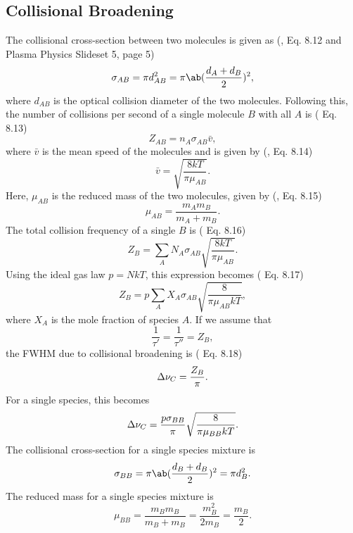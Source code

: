 \documentclass[11pt, twoside, fleqn]{report}
\begin{document}
\subsection{Collisional Broadening}

The collisional cross-section between two molecules is given as (\cite{hansonSpectroscopyOpticalDiagnostics2016}, Eq. 8.12 and Plasma Physics Slideset 5, page 5)
\begin{equation*}
    \sigma_{AB} = \pi d_{AB}^2 = \pi\ab(\frac{d_A + d_B}{2})^2,
\end{equation*}
where $d_{AB}$ is the optical collision diameter of the two molecules. Following this, the number of collisions per second of a single molecule $B$ with all $A$ is (\cite{hansonSpectroscopyOpticalDiagnostics2016} Eq. 8.13)
\begin{equation*}
    Z_{AB} = n_A\sigma_{AB}\bar{v},
\end{equation*}
where $\bar{v}$ is the mean speed of the molecules and is given by (\cite{hansonSpectroscopyOpticalDiagnostics2016}, Eq. 8.14)
\begin{equation*}
    \bar{v} = \sqrt{\frac{8kT}{\pi\mu_{AB}}}.
\end{equation*}
Here, $\mu_{AB}$ is the reduced mass of the two molecules, given by (\cite{hansonSpectroscopyOpticalDiagnostics2016}, Eq. 8.15)
\begin{equation*}
    \mu_{AB} = \frac{m_Am_B}{m_A + m_B}.
\end{equation*}
The total collision frequency of a single $B$ is (\cite{hansonSpectroscopyOpticalDiagnostics2016} Eq. 8.16)
\begin{equation*}
    Z_B = \sum_AN_A\sigma_{AB}\sqrt{\frac{8kT}{\pi\mu_{AB}}}.
\end{equation*}
Using the ideal gas law $p = NkT$, this expression becomes (\cite{hansonSpectroscopyOpticalDiagnostics2016} Eq. 8.17)
\begin{equation*}
    Z_B = p\sum_AX_A\sigma_{AB}\sqrt{\frac{8}{\pi\mu_{AB}kT}},
\end{equation*}
where $X_A$ is the mole fraction of species $A$. If we assume that
\begin{equation*}
    \frac{1}{\tau'} = \frac{1}{\tau''} = Z_B,
\end{equation*}
the FWHM due to collisional broadening is (\cite{hansonSpectroscopyOpticalDiagnostics2016} Eq. 8.18)
\begin{equation*}
    \adif{\nu}_C = \frac{Z_B}{\pi}.
\end{equation*}
For a single species, this becomes
\begin{equation*}
    \adif{\nu}_C = \frac{p\sigma_{BB}}{\pi}\sqrt{\frac{8}{\pi\mu_{BB}kT}}.
\end{equation*}
The collisional cross-section for a single species mixture is
\begin{equation*}
    \sigma_{BB} = \pi\ab(\frac{d_B + d_B}{2})^2 = \pi d_B^2.
\end{equation*}
The reduced mass for a single species mixture is
\begin{equation*}
    \mu_{BB} = \frac{m_Bm_B}{m_B + m_B} = \frac{m_B^2}{2m_B} = \frac{m_B}{2}.
\end{equation*}
\end{document}
